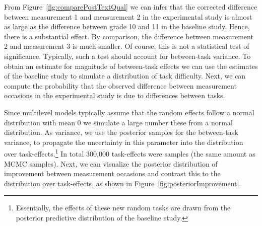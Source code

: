 \documentclass[a4paper]{article}
\newcommand{\DON}	[1] 	{\todo[linecolor=gray, backgroundcolor=white]	{Don: 	{#1}}}
\begin{document}
From Figure~\ref{fig:comparePostTextQual} we can infer that the corrected difference between measurement 1 and measurement 2 in the experimental study is almost as large as the difference between grade 10 and 11 in the baseline study. Hence, there is a substantial effect. By comparison, the difference between measurement 2 and measurement 3 is much smaller. Of course, this is not a statistical test of significance. Typically, such a test should account for between-task variance. To obtain an estimate for magnitude of between-task effects we can use the estimates of the baseline study to simulate a distribution of task difficulty. Next, we can compute the probability that the observed difference between measurement occasions in the experimental study is due to differences between tasks. 

Since \DON{tot hier gekomen!}multilevel models typically assume that the random effects follow a normal distribution with mean 0 we simulate a large number these from a normal distribution. As variance, we use the posterior samples for the between-task variance, to propagate the uncertainty in this parameter into the distribution over task-effects.\footnote{Essentially, the effects of these new random tasks are drawn from the posterior predictive distribution of the baseline study.} In total 300,000 task-effects were samples (the same amount as MCMC samples). Next, we can visualize the posterior distribution of improvement between measurement occasions and contrast this to the distribution over task-effects, as shown in Figure~\ref{fig:posteriorImprovement}.
\end{document}
